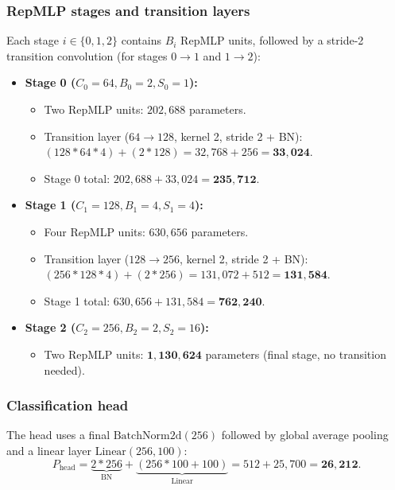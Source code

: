 \subsubsection{RepMLP stages and transition layers}
Each stage $i \in \{0, 1, 2\}$ contains $B_i$ RepMLP units, followed by a stride-2 transition convolution (for stages $0 \to 1$ and $1 \to 2$):
\begin{itemize}[leftmargin=1.5em]
    \item \textbf{Stage 0 ($C_0=64, B_0=2, S_0=1$):}
    \begin{itemize}
        \item Two RepMLP units: $202,688$ parameters.
        \item Transition layer ($64 \to 128$, kernel 2, stride 2 + BN): $(128 * 64 * 4) + (2 * 128) = 32,768 + 256 = \mathbf{33,024}$.
        \item Stage 0 total: $202,688 + 33,024 = \mathbf{235,712}$.
    \end{itemize}
    \item \textbf{Stage 1 ($C_1=128, B_1=4, S_1=4$):}
    \begin{itemize}
        \item Four RepMLP units: $630,656$ parameters.
        \item Transition layer ($128 \to 256$, kernel 2, stride 2 + BN): $(256 * 128 * 4) + (2 * 256) = 131,072 + 512 = \mathbf{131,584}$.
        \item Stage 1 total: $630,656 + 131,584 = \mathbf{762,240}$.
    \end{itemize}
    \item \textbf{Stage 2 ($C_2=256, B_2=2, S_2=16$):}
    \begin{itemize}
        \item Two RepMLP units: $\mathbf{1,130,624}$ parameters (final stage, no transition needed).
    \end{itemize}
\end{itemize}

\subsubsection{Classification head}
The head uses a final $\text{BatchNorm2d}(256)$ followed by global average pooling and a linear layer $\text{Linear}(256, 100)$:
\begin{equation}
    P_{\text{head}} = \underbrace{2 * 256}_{\text{BN}} + \underbrace{(256 * 100 + 100)}_{\text{Linear}} = 512 + 25,700 = \mathbf{26,212}.
\end{equation}

